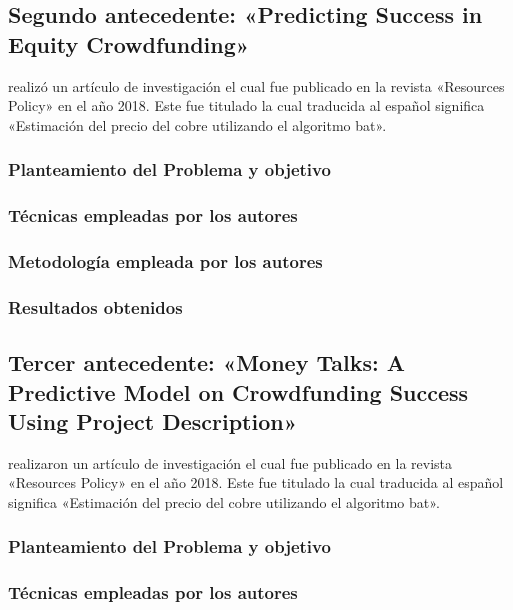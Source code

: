 \subsection{Segundo antecedente: «Predicting Success in Equity Crowdfunding» \citep*{pr_beckwith2016predcrowd}}
\citeauthor{pr_beckwith2016predcrowd} realizó un artículo de investigación el cual fue publicado en la revista «Resources Policy» en el año 2018. Este fue titulado  la cual traducida al español significa «Estimación del precio del cobre utilizando el algoritmo bat».

\subsubsection{Planteamiento del Problema y objetivo }


\subsubsection{Técnicas empleadas por los autores}
 

\subsubsection{Metodología empleada por los autores}


\subsubsection{Resultados obtenidos}



\subsection{Tercer antecedente: «Money Talks: A Predictive Model on Crowdfunding Success Using Project Description» \citep*{pr_zhou2018projectdesc}}
\citeauthor{pr_zhou2018projectdesc} realizaron un artículo de investigación el cual fue publicado en la revista «Resources Policy» en el año 2018. Este fue titulado  la cual traducida al español significa «Estimación del precio del cobre utilizando el algoritmo bat».

\subsubsection{Planteamiento del Problema y objetivo }


\subsubsection{Técnicas empleadas por los autores}


